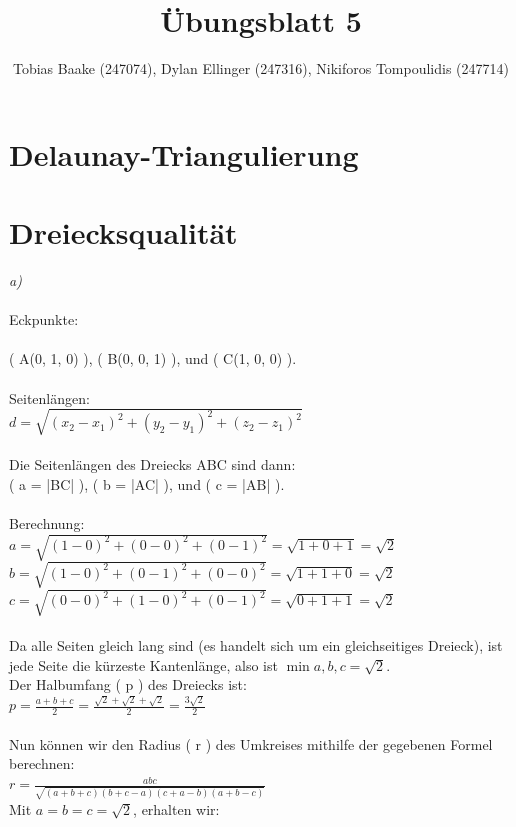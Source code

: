 \documentclass{article}
\title{Übungsblatt 5}
\author{Tobias Baake (247074), Dylan Ellinger (247316), Nikiforos Tompoulidis (247714)}
\begin{document}
\maketitle

\section{Delaunay-Triangulierung}


\section{Dreiecksqualität}
\emph{a)}\\
\\
Eckpunkte:
\\\\
( A(0, 1, 0) ), ( B(0, 0, 1) ), und ( C(1, 0, 0) ).
\\\\
Seitenlängen:
\\
$ d = \sqrt{(x_2-x_1)^2 + (y_2-y_1)^2 + (z_2-z_1)^2} $
\\\\
Die Seitenlängen des Dreiecks ABC sind dann:
\\
( a = |BC| ), ( b = |AC| ), und ( c = |AB| ).
\\\\
Berechnung:
\\
$ a = \sqrt{(1-0)^2 + (0-0)^2 + (0-1)^2} = \sqrt{1+0+1} = \sqrt{2} $
\\
$ b = \sqrt{(1-0)^2 + (0-1)^2 + (0-0)^2} = \sqrt{1+1+0} = \sqrt{2} $
\\
$ c = \sqrt{(0-0)^2 + (1-0)^2 + (0-1)^2} = \sqrt{0+1+1} = \sqrt{2} $
\\
\\
Da alle Seiten gleich lang sind (es handelt sich um ein gleichseitiges Dreieck), ist jede Seite die kürzeste Kantenlänge, also ist $ \min{a, b, c} = \sqrt{2} $.
\\
Der Halbumfang ( p ) des Dreiecks ist:
\\
$ p = \frac{a + b + c}{2} = \frac{\sqrt{2} + \sqrt{2} + \sqrt{2}}{2} = \frac{3\sqrt{2}}{2} $
\\\\
Nun können wir den Radius ( r ) des Umkreises mithilfe der gegebenen Formel berechnen:
\\
$ r = \frac{abc}{\sqrt{(a + b + c)(b + c - a)(c + a - b)(a + b - c)}} $
\\
Mit $ a = b = c = \sqrt{2} $, erhalten wir:
\\
\end{document}
